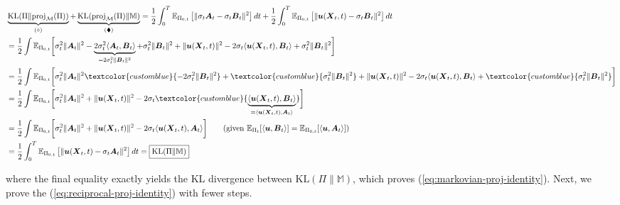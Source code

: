 \documentclass{article}
\newcommand{\bluetext}[1]{\textcolor{customblue}{#1}}
\begin{document}
\begin{small}
\begin{align}
    &\underbrace{\text{KL}(\Pi\|\text{proj}_{\mathcal{M}}(\Pi))}_{(\diamond)}+\underbrace{\text{KL}(\text{proj}_{\mathcal{M}}(\Pi)\|\mathbb{M})}_{(\blacklozenge)}=\frac{1}{2}\int_0^T\mathbb{E}_{\Pi_{0,t}}\left[\|\sigma_t\boldsymbol{A}_t-\sigma_t\boldsymbol{B}_t\|^2\right]dt+\frac{1}{2}\int_0^T\mathbb{E}_{\Pi_{0,t}}\left[\|\boldsymbol{u}(\boldsymbol{X}_t,t)-\sigma_t\boldsymbol{B}_t\|^2\right]dt\nonumber\\
    &=\frac{1}{2}\int \mathbb{E}_{\Pi_{0,t}}\bigg[\sigma_t^2\|\boldsymbol{A}_t\|^2-\underbrace{2\sigma_t^2\langle \boldsymbol{A}_t,\boldsymbol{B}_t\rangle}_{=2\sigma_t^2\|\boldsymbol{B}_t\|^2}+\sigma_t^2\|\boldsymbol{B}_t\|^2+\|\boldsymbol{u}(\boldsymbol{X}_t,t)\|^2-2\sigma_t\langle \boldsymbol{u}(\boldsymbol{X}_t,t),\boldsymbol{B}_t\rangle +\sigma_t^2\|\boldsymbol{B}_t\|^2\bigg]\nonumber\\
    &=\frac{1}{2}\int \mathbb{E}_{\Pi_{0,t}}\bigg[\sigma_t^2\|\boldsymbol{A}_t\|^2\bluetext{-2\sigma_t^2\|\boldsymbol{B}_t\|^2}+\bluetext{\sigma_t^2\|\boldsymbol{B}_t\|^2}+\|\boldsymbol{u}(\boldsymbol{X}_t,t)\|^2-2\sigma_t\langle \boldsymbol{u}(\boldsymbol{X}_t,t),\boldsymbol{B}_t\rangle +\bluetext{\sigma_t^2\|\boldsymbol{B}_t\|^2}\bigg]\nonumber\\
    &=\frac{1}{2}\int \mathbb{E}_{\Pi_{0,t}}\bigg[\sigma_t^2\|\boldsymbol{A}_t\|^2+\|\boldsymbol{u}(\boldsymbol{X}_t,t)\|^2-2\sigma_t\bluetext{\underbrace{\langle \boldsymbol{u}(\boldsymbol{X}_t,t),\boldsymbol{B}_t\rangle}_{=\langle \boldsymbol{u}(\boldsymbol{X}_t,t),\boldsymbol{A}_t\rangle }}\bigg]\nonumber\\
    &=\frac{1}{2}\int \mathbb{E}_{\Pi_{0,t}}\bigg[\sigma_t^2\|\boldsymbol{A}_t\|^2+\|\boldsymbol{u}(\boldsymbol{X}_t,t)\|^2-2\sigma_t\langle \boldsymbol{u}(\boldsymbol{X}_t,t),\boldsymbol{A}_t\rangle\bigg]\tag{given $\mathbb{E}_{\Pi_t}[\langle \boldsymbol{u},\boldsymbol{B}_t\rangle]=\mathbb{E}_{\Pi_{0,t}}[\langle \boldsymbol{u},\boldsymbol{A}_t\rangle]$}\\
    &=\frac{1}{2}\int_0^T\mathbb{E}_{\Pi_{0,t}}\left[\|\boldsymbol{u}(\boldsymbol{X}_t,t)-\sigma_t\boldsymbol{A}_t\|^2\right]dt=\boxed{\text{KL}(\Pi\|\mathbb{M})}
\end{align}
\end{small}
where the final equality exactly yields the KL divergence between $\text{KL}(\Pi\|\mathbb{M})$, which proves (\ref{eq:markovian-proj-identity}). Next, we prove the (\ref{eq:reciprocal-proj-identity}) with fewer steps. 
\end{document}
